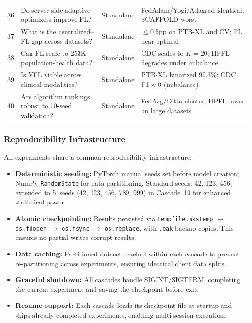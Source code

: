 \documentclass[conference]{IEEEtran}
\begin{document}
\begin{table}[htbp]
{\begin{tabular}{clll}
\midrule
36 & Do server-side adaptive optimizers improve FL? & Standalone & FedAdam/Yogi/Adagrad identical; SCAFFOLD worst \\
37 & What is the centralized--FL gap across datasets? & Standalone & $\leq$0.5pp on PTB-XL and CV; FL near-optimal \\
38 & Can FL scale to 253K population-health data? & Standalone & CDC scales to $K{=}20$; HPFL degrades under imbalance \\
39 & Is VFL viable across clinical modalities? & Standalone & PTB-XL binarized 99.3\%; CDC F1$\approx$0 (imbalance) \\
40 & Are algorithm rankings robust to 10-seed validation? & Standalone & FedAvg/Ditto cluster; HPFL lower on large datasets \\
\bottomrule
\end{tabular}%
}
\end{table}


\subsubsection{Reproducibility Infrastructure}

All experiments share a common reproducibility infrastructure:

\begin{itemize}
    \item \textbf{Deterministic seeding:} PyTorch manual seeds set before model creation; NumPy \texttt{RandomState} for data partitioning. Standard seeds: 42, 123, 456; extended to 5~seeds (42, 123, 456, 789, 999) in Cascade~10 for enhanced statistical power.
    \item \textbf{Atomic checkpointing:} Results persisted via \texttt{tempfile.mkstemp} $\to$ \texttt{os.fdopen} $\to$ \texttt{os.fsync} $\to$ \texttt{os.replace}, with \texttt{.bak} backup copies. This ensures no partial writes corrupt results.
    \item \textbf{Data caching:} Partitioned datasets cached within each cascade to prevent re-partitioning across experiments, ensuring identical client data splits.
    \item \textbf{Graceful shutdown:} All cascades handle SIGINT/SIGTERM, completing the current experiment and saving the checkpoint before exit.
    \item \textbf{Resume support:} Each cascade loads its checkpoint file at startup and skips already-completed experiments, enabling multi-session execution.
\end{itemize}
\end{document}

